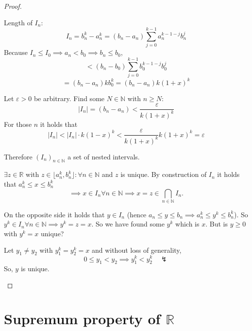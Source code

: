 \documentclass[a4paper,landscape,twocolumn]{article}
\theoremstyle{definition}
\newcommand\abs[1]{\left|#1\right|}
\begin{document}
\begin{proof}
\begin{description}
      Length of $I_n$:
      \[ I_n = b_n^k - a_n^k = (b_n - a_n) \sum_{j=0}^{k-1} a_n^{k-1-j} b_n^j \]
      Because $I_n \leq I_0 \implies a_n < b_0 \implies b_n \leq b_0$,
      \[ < (b_n - b_0) \sum_{j=0}^{k-1} b_0^{k-1-j} b_0^{j} \]
      \[ = (b_n - a_n) k b_0^k = (b_n - a_n) k (1 + x)^k \]

      Let $\varepsilon > 0$ be arbitrary. Find some $N \in \mathbb N$ with $n \geq N$:
      \[ \abs{I_n} = (b_n - a_n) < \frac{\varepsilon}{k (1 + x)^k} \]
      For those $n$ it holds that
      \[ \abs{I_n} < \abs{I_n} \cdot k (1 - x)^k < \frac{\varepsilon}{k (1 + x)^k} k (1 + x)^k = \varepsilon \]

      Therefore $(I_n)_{n \in \mathbb N}$ a set of nested intervals.

      $\exists z \in \mathbb R$ with $z \in \lfloor a_n^k, b_n^k\rfloor: \forall n \in \mathbb N$
      and $z$ is unique. By construction of $I_n$ it holds that $a_n^k \leq x \leq b_n^k$
      \[ \implies x \in I_n \forall n \in \mathbb N \implies x = z \in \bigcap_{n \in \mathbb N} I_n. \]

      On the opposite side it holds that $y \in I_n$ (hence $a_n \leq y \leq b_n \implies a_n^k \leq y^k \leq b_n^k$).
      So $y^k \in I_n \forall n \in \mathbb N \implies y^k = z = x$.
      So we have found some $y^k$ which is $x$. But is $y \geq 0$ with $y^k = x$ unique?

      Let $y_1 \neq y_2$ with $y_1^k = y_2^k = x$ and without loss of generality,
      \[ 0 \leq y_1 < y_2 \implies y_1^k < y_2^k \quad\lightning \]
      So, $y$ is unique.
  \end{description}
\end{proof}

\section{Supremum property of $\mathbb R$}
\end{document}
